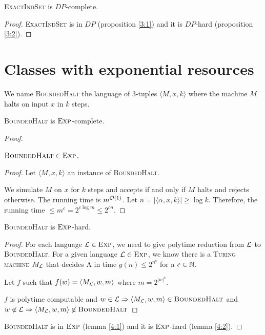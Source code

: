 \begin{theoreme}
    \textsc{ExactIndSet} is $DP$-complete.
\end{theoreme}
\begin{proof}
    \textsc{ExactIndSet} is in $DP$ (proposition \ref{3:1}) and it is $DP$-hard (proposition \ref{3:2}).
\end{proof}

\section{Classes with exponential resources}

We name \textsc{BoundedHalt} the language of 3-tuples $\langle M,x,k\rangle$ where the machine $M$ halts on input $x$ in $k$ steps.

\begin{thm}
    \textsc{BoundedHalt} is $\textsc{Exp}$-complete.
\end{thm}
\begin{proof}

\begin{lemma}\label{4:1}
    $\textsc{BoundedHalt} \in \textsc{Exp}$.
\end{lemma}
\begin{proof}
Let $\langle M,x,k\rangle$ an instance of \textsc{BoundedHalt}.

We simulate $M$ on $x$ for $k$ steps and accepts if and only if $M$ halts and rejects otherwise. The running time is $m^{\mathcal O \left( 1 \right)}$. Let $n = \vert \langle\alpha,x,k\rangle \vert \geqslant \log k$. Therefore, the running time $\leqslant m^c = 2^{c\log m} \leqslant 2^{cn}$.
\end{proof}

\begin{lemma}\label{4:2}
    \textsc{BoundedHalt} is $\textsc{Exp}$-hard.
\end{lemma}
\begin{proof}
For each language $\mathcal{L} \in \textsc{Exp}$, we need to give polytime reduction from $\mathcal{L}$ to \textsc{BoundedHalt}. For a given language $\mathcal{L} \in \textsc{Exp}$, we know there is a \textsc{Turing machine} $M_{\mathcal{L}}$ that decides A in time $g(n) \leqslant 2^{n^c}$ for a $c\in\mathbb{N}$.

Let $f$ such that $f(w) = \langle M_{\mathcal{L}}, w, m\rangle$ where $m = 2^{|w|^c}$.

$f$ is polytime computable and $w \in \mathcal{L} \Rightarrow \langle M_{\mathcal{L}}, w, m\rangle \in \textsc{BoundedHalt}$ and $w \not\in \mathcal{L} \Rightarrow \langle M_{\mathcal{L}}, w, m\rangle \not\in \textsc{BoundedHalt}$
\end{proof}
    \textsc{BoundedHalt} is in $\textsc{Exp}$ (lemma \ref{4:1}) and it is $\textsc{Exp}$-hard (lemma \ref{4:2}).
\end{proof}

